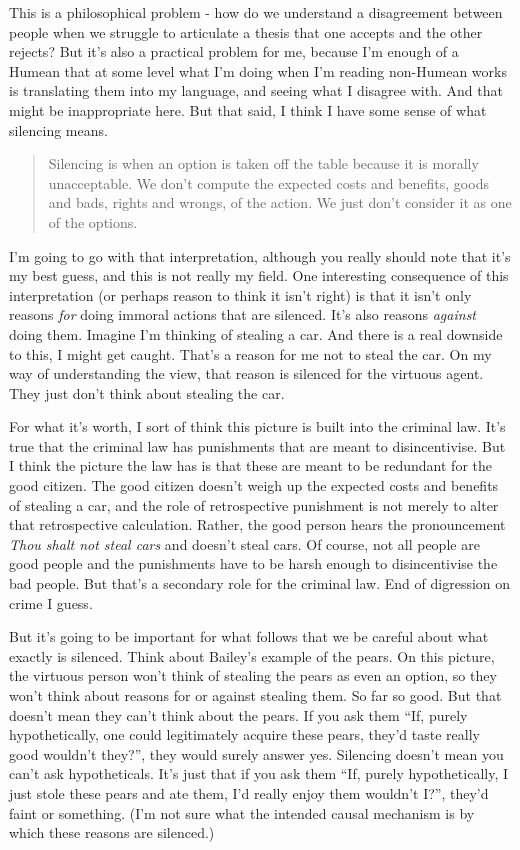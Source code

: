 \documentclass[
]{article}
\begin{document}
This is a philosophical problem - how do we understand a disagreement
between people when we struggle to articulate a thesis that one accepts
and the other rejects? But it's also a practical problem for me, because
I'm enough of a Humean that at some level what I'm doing when I'm
reading non-Humean works is translating them into my language, and
seeing what I disagree with. And that might be inappropriate here. But
that said, I think I have some sense of what silencing means.

\begin{quote}
Silencing is when an option is taken off the table because it is morally
unacceptable. We don't compute the expected costs and benefits, goods
and bads, rights and wrongs, of the action. We just don't consider it as
one of the options.
\end{quote}

I'm going to go with that interpretation, although you really should
note that it's my best guess, and this is not really my field. One
interesting consequence of this interpretation (or perhaps reason to
think it isn't right) is that it isn't only reasons \emph{for} doing
immoral actions that are silenced. It's also reasons \emph{against}
doing them. Imagine I'm thinking of stealing a car. And there is a real
downside to this, I might get caught. That's a reason for me not to
steal the car. On my way of understanding the view, that reason is
silenced for the virtuous agent. They just don't think about stealing
the car.

For what it's worth, I sort of think this picture is built into the
criminal law. It's true that the criminal law has punishments that are
meant to disincentivise. But I think the picture the law has is that
these are meant to be redundant for the good citizen. The good citizen
doesn't weigh up the expected costs and benefits of stealing a car, and
the role of retrospective punishment is not merely to alter that
retrospective calculation. Rather, the good person hears the
pronouncement \emph{Thou shalt not steal cars} and doesn't steal cars.
Of course, not all people are good people and the punishments have to be
harsh enough to disincentivise the bad people. But that's a secondary
role for the criminal law. End of digression on crime I guess.

But it's going to be important for what follows that we be careful about
what exactly is silenced. Think about Bailey's example of the pears. On
this picture, the virtuous person won't think of stealing the pears as
even an option, so they won't think about reasons for or against
stealing them. So far so good. But that doesn't mean they can't think
about the pears. If you ask them ``If, purely hypothetically, one could
legitimately acquire these pears, they'd taste really good wouldn't
they?'', they would surely answer yes. Silencing doesn't mean you can't
ask hypotheticals. It's just that if you ask them ``If, purely
hypothetically, I just stole these pears and ate them, I'd really enjoy
them wouldn't I?'', they'd faint or something. (I'm not sure what the
intended causal mechanism is by which these reasons are silenced.)
\end{document}
